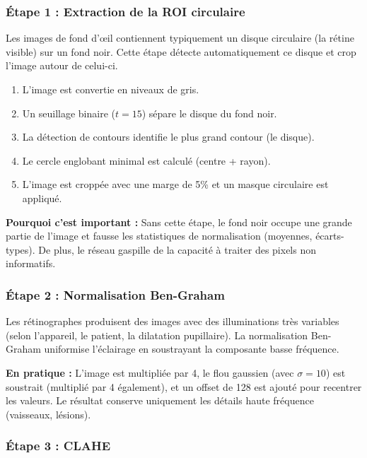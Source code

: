 ﻿\documentclass[11pt,a4paper]{article}
\begin{document}
\subsubsection{Étape 1 : Extraction de la ROI circulaire}

Les images de fond d'œil contiennent typiquement un disque circulaire (la rétine visible) sur un fond noir. Cette étape détecte automatiquement ce disque et crop l'image autour de celui-ci.

\begin{infobox}
\begin{enumerate}[leftmargin=1.5em]
  \item L'image est convertie en niveaux de gris.
  \item Un seuillage binaire ($t = 15$) sépare le disque du fond noir.
  \item La détection de contours identifie le plus grand contour (le disque).
  \item Le cercle englobant minimal est calculé (centre + rayon).
  \item L'image est croppée avec une marge de 5\% et un masque circulaire est appliqué.
\end{enumerate}
\end{infobox}

\textbf{Pourquoi c'est important :} Sans cette étape, le fond noir occupe une grande partie de l'image et fausse les statistiques de normalisation (moyennes, écarts-types). De plus, le réseau gaspille de la capacité à traiter des pixels non informatifs.

\subsubsection{Étape 2 : Normalisation Ben-Graham}

Les rétinographes produisent des images avec des illuminations très variables (selon l'appareil, le patient, la dilatation pupillaire). La normalisation Ben-Graham uniformise l'éclairage en soustrayant la composante basse fréquence.

\textbf{En pratique :} L'image est multipliée par 4, le flou gaussien (avec $\sigma = 10$) est soustrait (multiplié par 4 également), et un offset de 128 est ajouté pour recentrer les valeurs. Le résultat conserve uniquement les détails haute fréquence (vaisseaux, lésions).

\subsubsection{Étape 3 : CLAHE}
\end{document}
